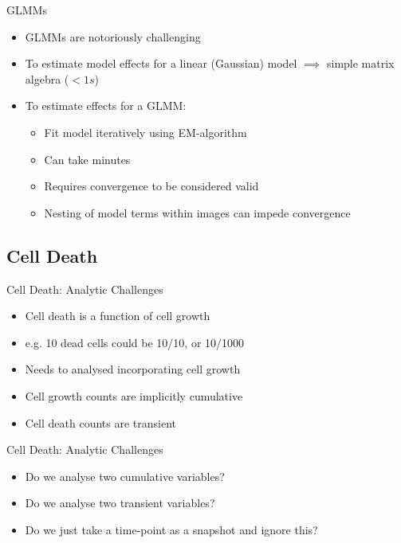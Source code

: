 \documentclass[11pt]{beamer}
\begin{document}
\begin{frame}{GLMMs}

	\begin{itemize}
		\item GLMMs are notoriously challenging
		\item To estimate model effects for a linear (Gaussian) model $\implies$ simple matrix algebra ($<1s$)
		\item To estimate effects for a GLMM:
		\begin{itemize}
			\item Fit model iteratively using EM-algorithm
			\item Can take minutes			
			\item Requires convergence to be considered valid
			\item Nesting of model terms within images can impede convergence
		\end{itemize}
	\end{itemize}
	
\end{frame}	

\subsection{Cell Death}
	
\begin{frame}{Cell Death: Analytic Challenges}

	\begin{itemize}
		\item Cell death is a function of cell growth
		\item e.g. 10 dead cells could be 10/10, or 10/1000
		\item Needs to analysed incorporating cell growth
		\item Cell growth counts are implicitly cumulative
		\item Cell death counts are transient
	\end{itemize}

\end{frame}

\begin{frame}{Cell Death: Analytic Challenges}

	\begin{itemize}
		\item Do we analyse two cumulative variables?
		\item Do we analyse two transient variables?
		\item Do we just take a time-point as a snapshot and ignore this?
	\end{itemize}
	
	
\end{frame}
\end{document}

